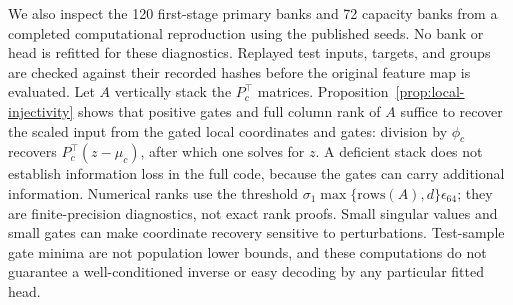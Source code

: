 We also inspect the 120 first-stage primary banks and 72 capacity banks from a
completed computational reproduction using the published seeds. No bank or head is
refitted for these diagnostics. Replayed test inputs, targets, and groups are checked
against their recorded hashes before the original feature map is evaluated.
Let $A$ vertically stack the $P_c^\top$ matrices. Proposition~\ref{prop:local-injectivity}
shows that positive gates and full column rank of $A$ suffice to recover the scaled
input from the gated local coordinates and gates:
division by $\phi_c$ recovers $P_c^\top(z-\mu_c)$, after which one solves for $z$.
A deficient stack does not establish information loss in the full code, because the
gates can carry additional information. Numerical ranks use the threshold
$\sigma_1\max\{\text{rows}(A),d\}\epsilon_{64}$; they are finite-precision diagnostics,
not exact rank proofs. Small singular values and small gates can make coordinate
recovery sensitive to perturbations. Test-sample gate minima are not population
lower bounds, and these computations do not guarantee a well-conditioned inverse
or easy decoding by any particular fitted head.
\begin{table}[htbp]
\caption{Retrospective diagnostics over 24 stored banks per row. Rank ranges concern
the stacked local bases in input dimension $d$. The smallest singular value and
gate entries are minima over the inspected banks (and, for gates, their original
test observations); $\kappa_2$ is the largest stack condition number. A dash means
that not every stack in that row has full numerical column rank. KAHM and affine
representations share the basis stack. Computational reproduction supplies no new
independent statistical replications.}
\label{tab:review-banks}
\centering\small\setlength{\tabcolsep}{3pt}

\end{table}
